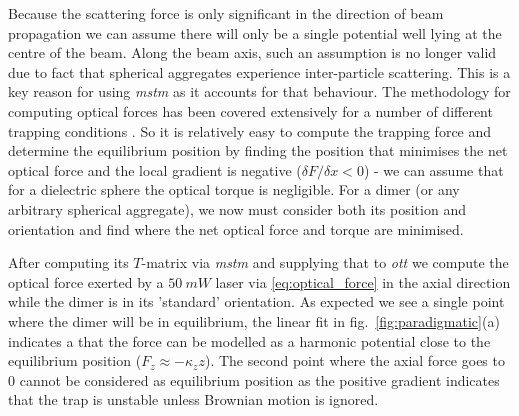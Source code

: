 Because the scattering force is only significant in the 
direction of beam propagation \cite{Capitanio2002} we 
can assume there will only be a single potential well 
lying at the centre of the beam. Along the beam axis, 
such an assumption is no longer valid due to fact that 
spherical aggregates experience inter-particle scattering. 
This is a key reason for using \textit{mstm} as it 
accounts for that behaviour. The methodology for computing 
optical forces has been covered extensively for a number 
of different trapping conditions \cite{RanhaNeves2019}. 
So it is relatively easy to compute the trapping force 
and determine the equilibrium position by finding the 
position that minimises the net optical force and the 
local gradient is negative ($\delta F/\delta x < 0$) - 
we can assume that for a dielectric sphere the optical 
torque is negligible. For a dimer (or any arbitrary 
spherical aggregate), we now must consider both its 
position and orientation and find where the net optical 
force and torque are minimised. 

After computing its $T$-matrix via \textit{mstm} and 
supplying that to \textit{ott} we compute the optical 
force exerted by a $50\ mW$ laser via \eqref{eq:optical_force} 
in the axial direction while the dimer is in its 'standard' 
orientation. As expected we see a single point where 
the dimer will be in equilibrium, the linear fit in 
fig.~\ref{fig:paradigmatic}(a) indicates a that the 
force can be modelled as a harmonic potential close to 
the equilibrium position ($F_z\approx-\kappa_z z$). 
The second point where the axial force goes to 0 cannot 
be considered as equilibrium position as the positive 
gradient indicates that the trap is unstable unless 
Brownian motion is ignored. 

